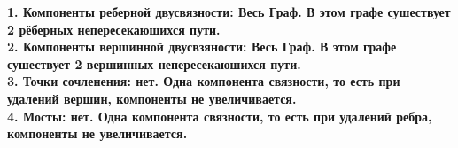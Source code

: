 \documentclass{article}
\begin{document}
\large{\textbf{1. Компоненты реберной двусвязности: Весь Граф. В этом графе сушествует 2  рёберных непересекаюшихся пути.}}\newline \\
\large{\textbf{2. Компоненты вершинной двусвзяности: Весь Граф. В этом графе сушествует 2 вершинных непересекаюшихся пути.}}\newline\\
\large{\textbf{3. Точки сочленения: нет. Одна компонента связности, то есть при удалений вершин, компоненты не увеличивается. }}\newline\\
\large{\textbf{4. Мосты: нет. Одна компонента связности, то есть при удалений ребра, компоненты не увеличивается.}}\newline
\end{document}
